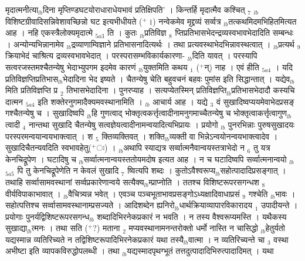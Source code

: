 \documentclass[article,12pt,a4paper]{memoir}%
\newcommand{\add}[1]{($^{+}$#1)}
\begin{document}
मृदात्मनीत्या{\tiny $_{lb}$}दिना मृप्तिण्डघटयोराधाराधेयभावं प्रतिक्षिपति’ । किन्तर्हि मृदात्मैव कश्चित् {\tiny $_{7}$} {\tiny $_{lb}$}विशिष्टग्रीवादिसन्निवेशावच्छिन्नो घट इत्यभीधीयते \add{।} नन्वेकमेव मृद्द्रव्यं सर्व्वत्र {\tiny $_{lb}$}तत्कथमिदमभिहितमित्यत आह । {\color{DodgerBlue3}नहि एकस्त्रैलोक्यमृदात्मे} {\tiny $_{5a3}$} ति । कुतः {\tiny $_{lb}$}प्रतिविज्ञ {\tiny $_{8}$} प्तिप्रतिभासभेदन्द्रव्यस्वभावभेदादिति सम्बन्धः । अन्योन्यभिन्नानामेव {\tiny $_{lb}$}द्रव्याणाम्विज्ञाने प्रतिभासनादित्यर्थः । तथा प्रत्यवस्थाभेदभिन्नावस्थत्वात् । {\tiny $_{lb}$}प्रत्यर्थ {\tiny $_{9}$} \leavevmode{} क्रियाभेदं चाश्रित्य द्रव्यस्वभावभेदात् । परस्परासम्भविकार्यकारणा- {\tiny $_{lb}$}दिति यावत् । परस्यापि सत्वरजस्तमश्चैतन्येषु भेदाभ्युपगम इदमेव कारणं {\tiny $_{lb}$}युक्तमिति कथय {\tiny $_{1}$} \add{न्} नाह । {\color{DodgerBlue3}एवं हीति} {\tiny $_{5a4}$} । यदि प्रतिविज्ञप्तिप्रतिभास{\tiny $_{lb}$}भेदादिना भेद इष्यते । चैतन्येषु चेति बहुवचनं बहवः पुमांस इति सिद्धान्तात् । यद्येव{\tiny $_{lb}$}मिति प्रतिविज्ञप्ति प्र {\tiny $_{2}$} तिभासभेदादिना । पुनरप्याह । {\color{DodgerBlue3}सत्यप्येतस्मिन्} प्रतिविज्ञप्ति{\tiny $_{lb}$}प्रतिभासभेदादौ कस्यचि {\color{DodgerBlue3}दात्मन} {\tiny $_{5a4}$} इति शक्तेरनुगमादैक्यमवस्थानामिति । {\tiny $_{lb}$} {\color{DodgerBlue3}आचार्य} आह । {\color{DodgerBlue3}यद्ये {\tiny $_{3}$} वं सुखादिष्वप्ययमेवाभेदप्रसङ्} गश्चैतन्येषु च । सुखादिष्वपि {\tiny $_{lb}$}हि गुणत्वाद् भोक्तृत्वकर्त्तृत्वादीनामनुगमाच्चैतन्येषु च भोक्तृत्वाकर्त्तृत्वागुण{\tiny $_{lb}$}त्वादी {\tiny $_{4}$} नान्तथा सुखादि चैतन्येषु सत्वज्ञेयत्वादीनामन्वयादित्यभिप्रायः । प्रयोगो {\tiny $_{lb}$} पुनरभिन्नाः पुरुषसुखादयः परस्परमन्वयान्वयभाक्त्वात् । श {\tiny $_{5}$} क्तिव्यक्तिवत् । शक्ति{\tiny $_{lb}$}व्यक्ती वा भिन्नेऽन्वयोनन्वयभाक्त्वादेव । सुखादिचैतन्यवदिति स्वभावहेतु\add{ः} । {\tiny $_{lb}$}अथापि स्याद्यत्र सर्व्वात्मनैवान्वयस्तत्राभेदो न {\tiny $_{6}$} तु यत्र केनचिद्रूपेण । घटादिषु च {\tiny $_{lb}$}सर्व्वात्मनान्वयस्ततोयमदोष इत्यत आह । {\color{DodgerBlue3}न च घटादिष्वपि सर्व्वात्मनान्वयो {\tiny $_{lb}$} {\tiny $_{5a5}$} पि तु केनचिद्रूपेणेति} न केवलं सुखादि {\tiny $_{7}$} ष्वित्यपि शब्दः । कुतोऽवैश्वरूप्य{\tiny $_{lb}$}सहोत्पादादिप्रसङ्गात् । तथाहि सर्व्वासामवस्थानां सर्व्वप्रकारेणान्वये सत्यैक्य{\tiny $_{lb}$}म्प्राप्नोति । ततश्च विशिष्टरूपरसगन्धश {\tiny $_{8}$} वीर्यविपाकाभावात् । {\tiny $_{lb}$}वैचित्र्यन्न भवेत् । एवञ्च पञ्चभूताभावप्रसङ्गोऽध्यक्षादिवाधाप्रसं {\tiny $_{9}$} \leavevmode{} गश्चेति {\tiny $_{lb}$}भावः । सहोत्पत्तिश्च सर्व्वासामवस्थानाम्प्रसज्यते । आदिशब्देन ह्यनिरो{\tiny $_{lb}$}धार्थक्रियाव्यापारविकारादय {\tiny $_{1}$} उपादीयन्ते । प्रयोगाः पुनर्यद्विशिष्टरूपरसगन्ध{\tiny $_{lb}$} \leavevmode{} शब्दादिभिरनेकप्रकारं न भवति । न तस्य वैश्वरूप्यमस्ति । यथैकस्य सुखाद्या{\tiny $_{lb}$}त्मनः । तथा सति \add{?} मताना {\tiny $_{2}$} मप्यवस्थानामनन्तरोक्तो धर्मो नास्ति न चासिद्धो {\tiny $_{lb}$}हेतुर्यतो यद्यस्मान्न व्यतिरिच्यते न तद्विशिष्टरूपादिभिरनेकप्रकारं यथा तस्यै{\tiny $_{lb}$}वात्मा । न व्यतिरिच्यन्ते चा {\tiny $_{3}$} वस्था अभीष्टा इति व्यापकविरुद्धोपलब्धी । तथा {\tiny $_{lb}$}यद्यस्मादपृथग्भूतं तत्तदुत्पादादिभिरुत्पादादिमत् । यथा 
\end{document}
